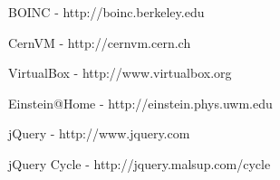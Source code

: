 \documentclass[twocolumn,aps]{revtex4}
\makeatletter
\newcommand{\cernvm}{CernVM}
\newcommand{\boinc}{BOINC}
\newcommand{\virtualbox}{VirtualBox}
\newcommand{\einsteinathome}{Einstein@Home}
\newcommand{\jquery}{jQuery}
\makeatother
\begin{document}
  \begin{thebibliography}{9}

      \boinc{} - http://boinc.berkeley.edu

      \cernvm{} - http://cernvm.cern.ch

      \virtualbox{} - http://www.virtualbox.org

      \einsteinathome{} - http://einstein.phys.uwm.edu

      \jquery{} - http://www.jquery.com

      \jquery{} Cycle - http://jquery.malsup.com/cycle

  \end{thebibliography}
\end{document}

